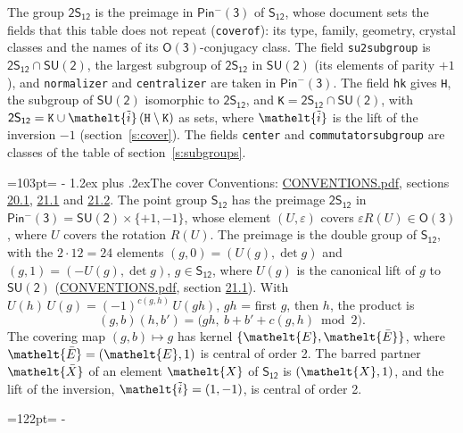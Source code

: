 \documentclass[10pt,a4paper]{article}
\makeatletter
\renewcommand\section{\@startsection{section}{1}{\z@}{-3ex plus -1ex minus -.2ex}%
  {1.2ex plus .2ex}{\normalfont\large\sffamily\bfseries\color{parttitle}}}
\newcommand{\needspace}[1]{\par\penalty-100\begingroup\dimen0=#1\relax\dimen2=\pagegoal
  \advance\dimen2-\pagetotal\ifdim\dimen0>\dimen2\relax\ifdim\dimen2>0pt\vfil\break\fi\fi
  \endgroup}
\numberwithin{equation}{section}
\newcommand{\eltfont}[1]{{\let\sigma\eltsigma\mathelt{#1}}}
\newcommand{\grp}[1]{\mathsf{#1}}
\newcommand{\elt}[1]{\eltfont{#1}}
\newcommand{\dirprod}{\times}
\newcommand{\barred}[1]{\bar{#1}}
\newcommand{\lift}[1]{\tilde{#1}}
\makeatother
\begin{document}
\leavevmode\label{n:element.inversion}\label{n:group.preimage}The group $\grp{2S_{12}}$ is the preimage in $\grp{Pin^{-}(3)}$ of \href{../../../rotation/data/pdf/S12.pdf}{$\grp{S_{12}}$}, whose document sets the fields that this table does not repeat (\texttt{coverof}): its type, family, geometry, crystal classes and the names of its \href{../../../rotation/data/pdf/O3.pdf}{$\grp{O(3)}$}-conjugacy class. The field \texttt{su2subgroup} is $\grp{2S_{12}} \cap \grp{SU(2)}$, the largest subgroup of $\grp{2S_{12}}$ in $\grp{SU(2)}$ (its elements of parity $+1$), and \texttt{normalizer} and \texttt{centralizer} are taken in $\grp{Pin^{-}(3)}$. The field \texttt{hk} gives \texttt{H}, the subgroup of $\grp{SU(2)}$ isomorphic to $\grp{2S_{12}}$, and \texttt{K}${} = \grp{2S_{12}} \cap \grp{SU(2)}$, with $\grp{2S_{12}} = \texttt{K} \cup \elt{\lift{i}}\,(\texttt{H} \setminus \texttt{K})$ as sets, where $\elt{\lift{i}}$ is the lift of the inversion $-1$ (section~\ref{s:cover}). The fields \texttt{center} and \texttt{commutatorsubgroup} are classes of the table of section~\ref{s:subgroups}.
\needspace{103pt}
\section{The cover}\label{s:cover}
Conventions: \href{../../CONVENTIONS.pdf}{CONVENTIONS.pdf}, sections \href{../../CONVENTIONS.pdf\#conv.20.1}{20.1}, \href{../../CONVENTIONS.pdf\#conv.21.1}{21.1} and \href{../../CONVENTIONS.pdf\#conv.21.2}{21.2}.
\leavevmode\label{n:group.pin.minus}\label{n:group.su2}\label{n:local.pin.sign}\label{n:matrix.covered}\label{n:matrix.lift.su2}\label{n:index.bar}The point group $\grp{S_{12}}$ has the preimage $\grp{2S_{12}}$ in $\grp{Pin^{-}(3)} = \grp{SU(2)} \dirprod \{+1, -1\}$, whose element $(U, \varepsilon)$ covers $\varepsilon R(U) \in \grp{O(3)}$, where $U$ covers the rotation $R(U)$. The preimage is the double group of $\grp{S_{12}}$, with the $2 \cdot 12 = 24$ elements $(g, 0) = (U(g), \det g)$ and $(g, 1) = (-U(g), \det g)$, $g \in \grp{S_{12}}$, where $U(g)$ is the canonical lift of $g$ to $\grp{SU(2)}$ (\href{../../CONVENTIONS.pdf}{CONVENTIONS.pdf}, section \href{../../CONVENTIONS.pdf\#conv.21.1}{21.1}). \label{n:function.cocycle}With $U(h)\,U(g) = (-1)^{c(g,h)}\,U(gh)$, $gh$ = first $g$, then $h$, the product is
\begin{equation}\label{e:product}(g, b)(h, b') = \bigl(gh,\ b + b' + c(g, h) \bmod 2\bigr).\end{equation}
\leavevmode\label{n:mark.bar}The covering map $(g, b) \mapsto g$ has kernel $\{\elt{E}, \elt{\barred{E}}\}$, where $\elt{\barred{E}} = (\elt{E}, 1)$ is central of order 2. \label{n:element.named}\label{n:mark.lift}The barred partner $\elt{\barred{X}}$ of an element $\elt{X}$ of $\grp{S_{12}}$ is $(\elt{X}, 1)$, and the lift of the inversion, $\elt{\lift{i}} = (1, -1)$, is central of order 2.
\needspace{122pt}
\end{document}
